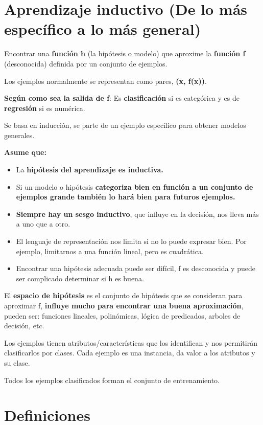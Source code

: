 \documentclass[12pt]{report} %
\begin{document}
\section{Aprendizaje inductivo (De lo más específico a lo más
general)}

Encontrar una \textbf{función h} (la hipótesis o modelo) que aproxime la
\textbf{función f} (desconocida) definida por un conjunto de ejemplos.

Los ejemplos normalmente se representan como pares, \textbf{(x, f(x))}.

\textbf{Según como sea la salida de f}: Es \textbf{clasificación} si es
categórica y es de \textbf{regresión} si es numérica.

Se basa en inducción, se parte de un ejemplo específico para obtener
modelos generales.

\textbf{Asume que:}

\begin{itemize}
\item
  La \textbf{hipótesis del aprendizaje es inductiva.}
\item
  Si un modelo o hipótesis \textbf{categoriza bien en función a un
  conjunto de ejemplos grande también lo hará bien para futuros
  ejemplos.}
\item
  \textbf{Siempre hay un sesgo inductivo}, que influye en la decisión,
  nos lleva más a uno que a otro.
\item
  El lenguaje de representación nos limita si no lo puede expresar bien.
  Por ejemplo, limitarnos a una función lineal, pero es cuadrática.
\item
  Encontrar una hipótesis adecuada puede ser difícil, f es desconocida y
  puede ser complicado determinar si h es buena.
\end{itemize}

El \textbf{espacio de hipótesis} es el conjunto de hipótesis que se
consideran para aproximar f, \textbf{influye mucho para encontrar una
buena aproximación}, pueden ser: funciones lineales, polinómicas, lógica
de predicados, arboles de decisión, etc.

Los ejemplos tienen atributos/características que los identifican y nos
permitirán clasificarlos por clases. Cada ejemplo es una instancia, da
valor a los atributos y su clase.

Todos los ejemplos clasificados forman el conjunto de entrenamiento.

\section{Definiciones}
\end{document}
